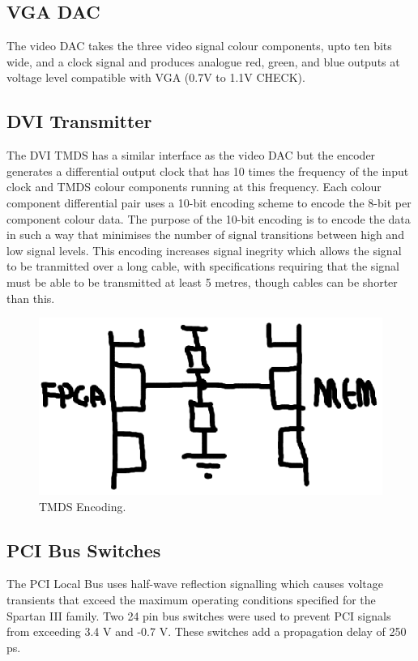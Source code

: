 \subsection{VGA DAC}
The video DAC takes the three video signal colour components, upto ten bits wide,
and a clock signal and produces analogue red, green, and blue outputs at voltage
level compatible with VGA (0.7V to 1.1V CHECK).



\subsection{DVI Transmitter}
The DVI TMDS has a similar interface as the video DAC but the encoder generates a
differential output clock that has 10 times the frequency of the input clock and
TMDS colour components running at this frequency. Each colour component
differential pair uses a 10-bit encoding scheme to encode the 8-bit per component
colour data. The purpose of the 10-bit encoding is to encode the data in such a
way that minimises the number of signal transitions between high and low signal
levels. This encoding increases signal inegrity which allows the signal to be
tranmitted over a long cable, with specifications requiring that the signal must
be able to be transmitted at least 5 metres, though cables can be shorter than
this.

\begin{figure}
\begin{center}
\includegraphics[width=\linewidth]{images/async_fifo.eps}
\caption{TMDS Encoding.}
\end{center}
\end{figure}




\subsection{PCI Bus Switches}
The PCI Local Bus uses half-wave reflection signalling\cite{PCI_Spec, PCI_Book}
which causes voltage transients that exceed the maximum operating conditions
specified for the Spartan III family\cite{Xilinx_SP3_DS}. Two 24 pin bus switches
were used to prevent PCI signals from exceeding 3.4 V and -0.7 V. These switches
add a propagation delay of 250 ps\cite{Bus_Switch_DS}.

